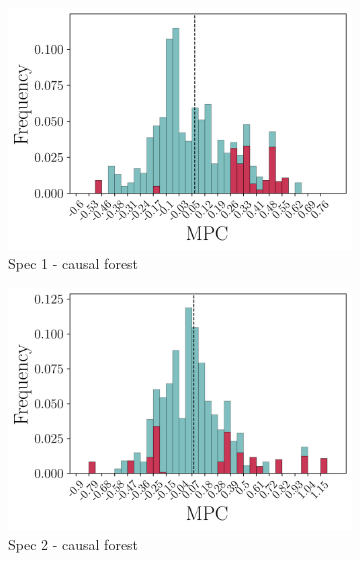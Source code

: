 \begin{figure}[t]
    \begin{subfigure}{0.33\linewidth}
        \includegraphics[width=\linewidth]{figures/distributions/spec1_cf_chFDexp.png}
        \caption{Spec 1 - causal forest}
    \end{subfigure}\hfill
    \begin{subfigure}{0.33\linewidth}
        \includegraphics[width=\linewidth]{figures/distributions/spec2_cf_chFDexp.png}
        \caption{Spec 2 - causal forest}
    \end{subfigure}\hfill
    \begin{subfigure}{0.33\linewidth}

\end{subfigure}
\end{figure}
